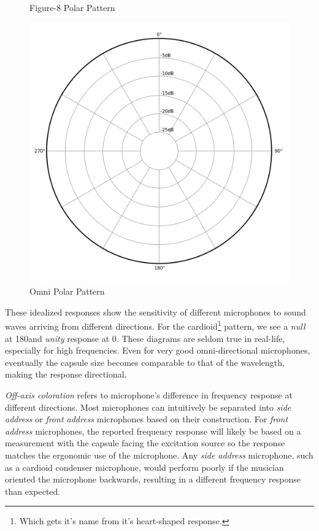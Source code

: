 \begin{figure}[!htb]
  \caption{Figure-8 Polar Pattern \cite{fig8_pic}}\label{fig:fig-8}
\endminipage\hfill
{}%
  \includegraphics[width=\linewidth]{img/omni.png}
  \caption{Omni Polar Pattern \cite{omni_pic}}\label{fig:omni}
\endminipage
\end{figure}

These idealized responses show the sensitivity of different microphones to sound waves arriving from different directions. For the cardioid\footnote{Which gets it's name from it's heart-shaped response.} pattern, we see a \textit{null} at 180\textdegree and \textit{unity} response at 0\textdegree. These diagrams are seldom true in real-life, especially for high frequencies. Even for very good omni-directional microphones, eventually the capsule size becomes comparable to that of the wavelength, making the response directional. 

\textit{Off-axis coloration} refers to microphone's difference in frequency response at different directions. Most microphones can intuitively be separated into \textit{side address} or \textit{front address} microphones based on their construction. For \textit{front address} microphones, the reported frequency response will likely be based on a measurement with the capsule facing the excitation source so the response matches the ergonomic use of the microphone. Any \textit{side address} microphone, such as a cardioid condenser microphone, would perform poorly if the musician oriented the microphone backwards, resulting in a different frequency response than expected.

